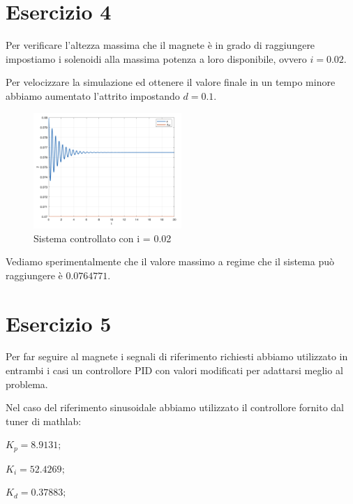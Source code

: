 \documentclass{article}
\newcommand{\spacer}[1][8pt]{
    \par\vspace{#1}
}
\begin{document}
\section{Esercizio 4}
Per verificare l'altezza massima che il magnete è in grado di raggiungere impostiamo i solenoidi alla massima potenza a loro disponibile, ovvero $i = 0.02$.

Per velocizzare la simulazione ed ottenere il valore finale in un tempo minore abbiamo aumentato l'attrito impostando $d = 0.1$.

\begin{figure}[H]
    \centering
    \includegraphics[width = 0.5\textwidth]{Images/max-z.png}
    \caption{Sistema controllato con i = 0.02}
    \label{fig:max-z}
\end{figure}

Vediamo sperimentalmente che il valore massimo a regime che il sistema può raggiungere è $0.0764771$.

\section{Esercizio 5}
Per far seguire al magnete i segnali di riferimento richiesti abbiamo utilizzato in entrambi i casi un controllore PID con valori modificati per adattarsi meglio al problema.

\spacer
Nel caso del riferimento sinusoidale abbiamo utilizzato il controllore fornito dal tuner di mathlab:

$K_p = 8.9131;$

$K_i = 52.4269;$

$K_d = 0.37883;$
\end{document}
